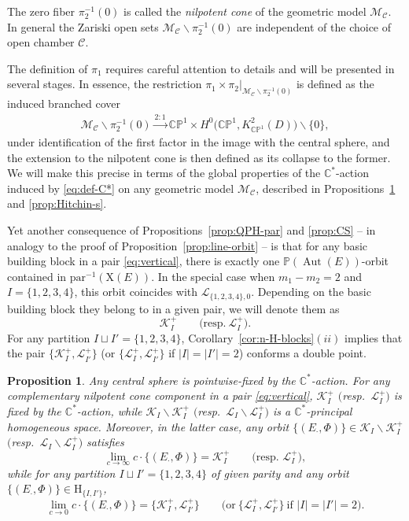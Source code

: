 \documentclass[pdftex]{sigma}
\newcommand{\field}[1]{\ensuremath{\mathbb{#1}}}
\newcommand{\CC}{\field{C}}
\newcommand{\PP}{\field{P}}
\newcommand{\curly}[1]{\mathscr{#1}}
\newcommand{\cK}{\curly{K}}
\newcommand{\cL}{\curly{L}}
\newcommand{\cM}{\curly{M}}
\newcommand{\qC}{\mathcal{C}}
\newcommand{\qp}{\boldsymbol{\cdot}}
\DeclareMathOperator{\Aut}{Aut}
\numberwithin{equation}{section}
\newtheorem{Proposition}[Theorem]{Proposition}
 { \theoremstyle{definition}
\newtheorem{Definition}[Theorem]{Definition}
\newtheorem{Note}[Theorem]{Note}
\newtheorem{Example}[Theorem]{Example}
\newtheorem{Remark}[Theorem]{Remark} }
\begin{document}
The zero fiber $\pi_{2}^{-1}(0)$ is called the \textit{nilpotent cone} of the geometric model $\cM_{\qC}$. In general the Zariski open sets $\cM_{\qC}\backslash \pi^{-1}_{2}(0)$ are independent of the choice of open chamber $\qC$.

The definition of $\pi_{1}$ requires careful attention to details and will be presented in several stages. In essence, the restriction $\pi_{1}\times\pi_{2}\vert_{\cM_{\qC}\backslash \pi^{-1}_{2}(0)}$ is defined as the induced branched cover
\begin{gather}\label{eq:branched-cover}
\cM_{\qC}\backslash \pi^{-1}_{2}(0)\xrightarrow{2:1} \CC\PP^{1}\times H^{0}\bigl(\CC\PP^{1},K^{2}_{\CC\PP^{1}}(D)\bigr)\backslash\{0\},
\end{gather}
under identification of the first factor in the image with the central sphere, and the extension to the nilpotent cone is then defined as its collapse to the former. We will make this precise in terms of the global properties of the $\CC^{*}$-action induced by \eqref{eq:def-C*} on any geometric model $\cM_{\qC}$, described in Propositions~\ref{prop:limits} and \ref{prop:Hitchin-s}.

Yet another consequence of Propositions~\ref{prop:QPH-par} and \ref{prop:CS} -- in analogy to the proof of Proposition~\ref{prop:line-orbit} -- is that for any basic building block in a pair \eqref{eq:vertical}, there is exactly one $\PP(\Aut(E))$-orbit contained in $\mathrm{par}^{-1}(\mathrm{X}(E))$. In the special case when $m_{1}-m_{2} = 2$ and $I= \{1,2,3,4\}$, this orbit coincides with $\cL_{\{1,2,3,4\},0}$. Depending on the basic building block they belong to in a given pair, we will denote them as
\[
\cK^{+}_{I}\qquad \big(\text{resp.} \ \cL^{+}_{I}\big).
\]
For any partition $I\sqcup I' = \{1,2,3,4\}$, Corollary~\ref{cor:n-H-blocks}$(ii)$ implies that the pair $\{\cK^{+}_{I},\cL^{+}_{I'}\}$ (or $\{\cL^{+}_{I},\cL^{+}_{I'}\}$ if $\vert I\vert =\vert I'\vert =2$) conforms a double point.

\begin{Proposition}\label{prop:limits}
Any central sphere is pointwise-fixed by the $\CC^{*}$-action.
For any complementary nilpotent cone component in a pair \eqref{eq:vertical}, $\cK^{+}_{I}$ $($resp.~$\cL^{+}_{I})$ is fixed by the $\CC^{*}$-action, while $\cK_{I}\backslash\cK_{I}^{+}$ $($resp.~$\cL_{I}\backslash\cL_{I}^{+})$ is a $\CC^{*}$-principal homogeneous space. Moreover, in the latter case, %
any orbit $\{(E_{\qp},\Phi)\}\in \cK_{I}\backslash\cK_{I}^{+}$ $($resp.~$\cL_{I}\backslash\cL_{I}^{+})$ satisfies
\[
\lim\limits_{c\to \infty}c\cdot\{(E_{\qp},\Phi)\} = \cK^{+}_{I}\qquad \big(\text{resp.~}\cL^{+}_{I}\big),
\]
while for any partition $I\sqcup I' = \{1,2,3,4\}$ of given parity and any orbit $\{(E_{\qp},\Phi)\}\in \mathrm{H}_{\{I,I'\}}$,
\[
\lim\limits_{c\to 0}c\cdot\{(E_{\qp},\Phi)\} = \big\{\cK^{+}_{I},\cL^{+}_{I'}\big\}\qquad \big(\text{or}\ \big\{\cL^{+}_{I},\cL^{+}_{I'}\big\}\ \text{if $\vert I\vert =\vert I'\vert =2$}\big).
\]
\end{Proposition}
\end{document}
